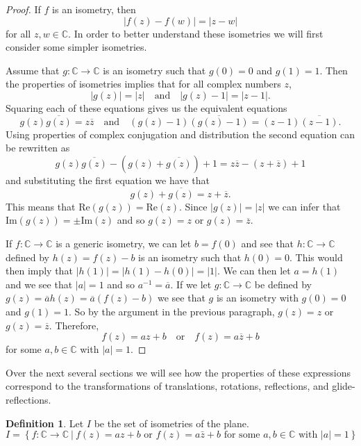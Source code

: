 \documentclass[
]{book}
\theoremstyle{definition}
\newtheorem{definition}{Definition}[chapter]
\theoremstyle{definition}
\theoremstyle{definition}
\theoremstyle{definition}
\theoremstyle{remark}
\begin{document}
\begin{proof}
If \(f\) is an isometry, then
\[|f(z)-f(w)|=|z-w|\] for all \(z,w\in \mathbb{C}\).
In order to better understand these isometries we will first consider some simpler isometries.

Assume that \(g:\mathbb{C}\rightarrow \mathbb{C}\) is an isometry such that \(g(0)=0\) and \(g(1)=1\). Then the properties of isometries implies that for all complex numbers \(z\),
\[|g(z)|=|z| \quad \mbox{and} \quad |g(z)-1|=|z-1|.\] Squaring each of these equations gives us the equivalent equations
\[g(z) \overline{g(z)} = z \overline{z} \quad \mbox{and} \quad (g(z)-1)\overline{(g(z)-1)} = (z-1)\overline{(z-1)}.\]
Using properties of complex conjugation and distribution the second equation can be rewritten as
\[g(z)\overline{g(z)} - (g(z)+\overline{g(z)}) +1 = z\overline{z} - (z+\overline{z}) +1\] and substituting the first equation we have that
\[g(z)+\overline{g(z)} = z+\overline{z}.\] This means that \(\mbox{Re}(g(z)) = \mbox{Re}(z)\). Since \(|g(z)|=|z|\) we can infer that \(\mbox{Im}(g(z))= \pm \mbox{Im}(z)\) and so \(g(z)=z\) or \(g(z)=\overline{z}\).

If \(f:\mathbb{C}\rightarrow \mathbb{C}\) is a generic isometry, we can let \(b=f(0)\) and see that \(h:\mathbb{C}\rightarrow\mathbb{C}\) defined by \(h(z)=f(z)-b\) is an isometry such that \(h(0)=0\). This would then imply that \(|h(1)| = |h(1)-h(0)|=|1|\). We can then let \(a=h(1)\) and we see that \(|a|=1\) and so \(a^{-1}=\overline{a}\). If we let \(g:\mathbb{C}\rightarrow \mathbb{C}\) be defined by \(g(z)=\overline{a} h(z) = \overline{a} (f(z)-b)\) we see that \(g\) is an isometry with \(g(0)=0\) and \(g(1)=1\). So by the argument in the previous paragraph, \(g(z)=z\) or \(g(z)=\overline{z}\). Therefore,
\[f(z)= az+b \quad \mbox{or} \quad f(z)=a \overline{z} +b\] for some \(a,b\in \mathbb{C}\) with \(|a|=1\).
\end{proof}

Over the next several sections we will see how the properties of these expressions correspond to the transformations of translations, rotations, reflections, and glide-reflections.

\begin{definition}
Let \(I\) be the set of isometries of the plane.
\[I = \left\{ f: \mathbb{C} \rightarrow \mathbb{C} \:\vert \: f(z)=a z+b \mbox{ or } f(z)=a \bar{z}+b \mbox{ for some } a, b \in \mathbb{C} \mbox{ with } |a|=1 \right\}\]
\end{definition}
\end{document}
